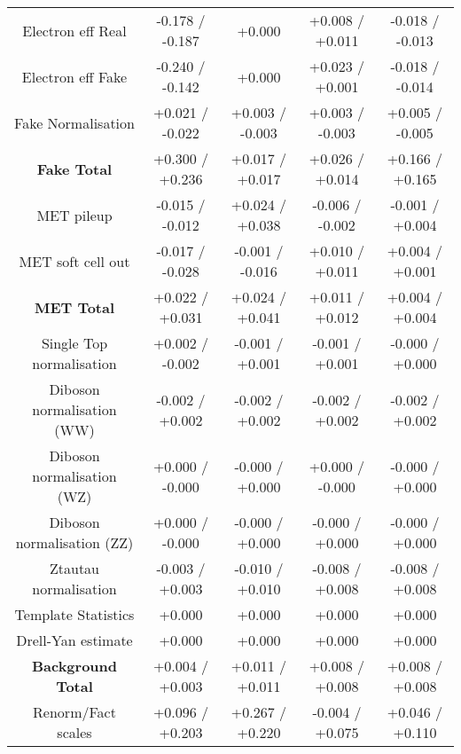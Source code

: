 \begin{table}[htbp]
\begin{center}
\begin{tabular}{|c|c|c|c|c|}
Electron eff Real                     &-0.178   / -0.187   & +0.000              & +0.008   / +0.011   & -0.018   / -0.013  \\
Electron eff Fake                     &-0.240   / -0.142   & +0.000              & +0.023   / +0.001   & -0.018   / -0.014  \\
Fake Normalisation                    &+0.021   / -0.022   & +0.003   / -0.003   & +0.003   / -0.003   & +0.005   / -0.005  \\
\hline
\textbf{Fake Total}                   &+0.300   / +0.236   & +0.017   / +0.017   & +0.026   / +0.014   & +0.166   / +0.165  \\
\hline
MET pileup                            &-0.015   / -0.012   & +0.024   / +0.038   & -0.006   / -0.002   & -0.001   / +0.004  \\
MET soft cell out                     &-0.017   / -0.028   & -0.001   / -0.016   & +0.010   / +0.011   & +0.004   / +0.001  \\
\hline
\textbf{MET Total}                    &+0.022   / +0.031   & +0.024   / +0.041   & +0.011   / +0.012   & +0.004   / +0.004  \\
\hline
Single Top normalisation              &+0.002   / -0.002   & -0.001   / +0.001   & -0.001   / +0.001   & -0.000   / +0.000  \\
Diboson normalisation (WW)            &-0.002   / +0.002   & -0.002   / +0.002   & -0.002   / +0.002   & -0.002   / +0.002  \\
Diboson normalisation (WZ)            &+0.000   / -0.000   & -0.000   / +0.000   & +0.000   / -0.000   & -0.000   / +0.000  \\
Diboson normalisation (ZZ)            &+0.000   / -0.000   & -0.000   / +0.000   & -0.000   / +0.000   & -0.000   / +0.000  \\
Ztautau normalisation                 &-0.003   / +0.003   & -0.010   / +0.010   & -0.008   / +0.008   & -0.008   / +0.008  \\
Template Statistics                   &+0.000              & +0.000              & +0.000              & +0.000             \\
Drell-Yan estimate                    &+0.000              & +0.000              & +0.000              & +0.000             \\
\hline
\textbf{Background Total}             &+0.004   / +0.003   & +0.011   / +0.011   & +0.008   / +0.008   & +0.008   / +0.008  \\
\hline
Renorm/Fact scales                    &+0.096   / +0.203   & +0.267   / +0.220   & -0.004   / +0.075   & +0.046   / +0.110  \\

\end{tabular}
\end{center}
\end{table}
